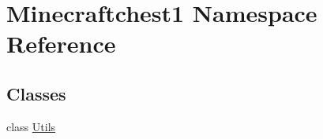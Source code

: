 \hypertarget{namespace_minecraftchest1}{}\section{Minecraftchest1 Namespace Reference}
\label{namespace_minecraftchest1}
\subsection*{Classes}
\begin{DoxyCompactItemize}
\item 
class \hyperlink{class_minecraftchest1_1_1_utils}{Utils}
\end{DoxyCompactItemize}
